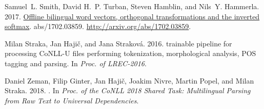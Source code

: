 \documentclass[11pt,a4paper]{article}
\begin{document}
\begin{thebibliography}{}
	Samuel~L. Smith, David H.~P. Turban, Steven Hamblin, and Nils~Y. Hammerla.
	2017.
	\newblock \href{http://arxiv.org/abs/1702.03859}{Offline bilingual word
		vectors, orthogonal transformations and the inverted softmax}.
	 abs/1702.03859.
	\newblock
	\href{http://arxiv.org/abs/1702.03859}{http://arxiv.org/abs/1702.03859}.
	
	Milan Straka, Jan Haji\v{c}, and Jana Strakov\'{a}. 2016.
	 trainable pipeline for processing {CoNLL-U} files
	performing tokenization, morphological analysis, {POS} tagging and parsing.
	\newblock In {\em Proc. of LREC-2016\/}.
	
	Daniel Zeman, Filip Ginter, Jan Haji{\v{c}}, Joakim Nivre, Martin Popel, and
	Milan Straka. 2018.
	.
	\newblock In {\em {Proc. of the CoNLL 2018 Shared Task: Multilingual Parsing
			from Raw Text to Universal Dependencies}\/}.
	

\end{thebibliography}
\end{document}
